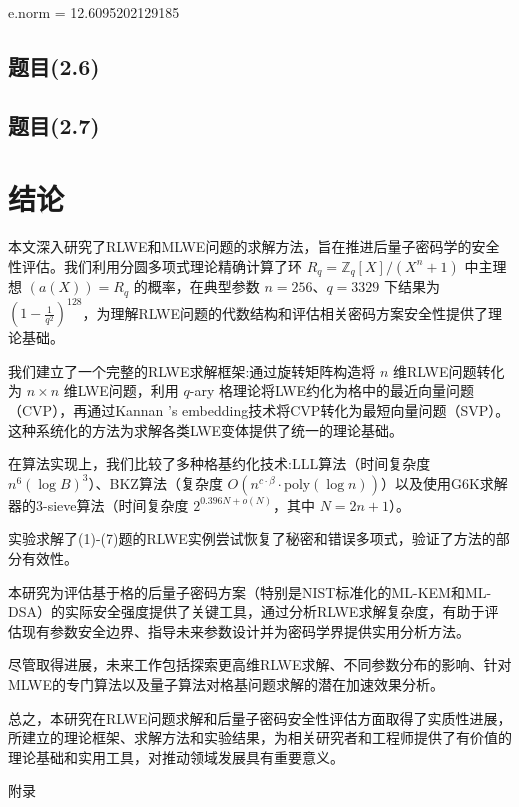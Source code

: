 \documentclass[12pt,a4paper]{article}
\numberwithin{equation}{section}
\begin{document}
e.norm = 12.6095202129185

\subsection{题目(2.6)}

\subsection{题目(2.7)}

\section{结论}

本文深入研究了RLWE和MLWE问题的求解方法，旨在推进后量子密码学的安全性评估。我们利用分圆多项式理论精确计算了环 $R_q = \mathbb{Z}_q[X]/(X^n + 1)$ 中主理想 $(a(X)) = R_q$ 的概率，在典型参数 $n = 256$、$q = 3329$ 下结果为 $(1-\frac{1}{q^2})^{128}$，为理解RLWE问题的代数结构和评估相关密码方案安全性提供了理论基础。

我们建立了一个完整的RLWE求解框架:通过旋转矩阵构造将 $n$ 维RLWE问题转化为 $n \times n$ 维LWE问题，利用 $q$-ary 格理论将LWE约化为格中的最近向量问题（CVP），再通过Kannan 's embedding技术将CVP转化为最短向量问题（SVP）。这种系统化的方法为求解各类LWE变体提供了统一的理论基础。

在算法实现上，我们比较了多种格基约化技术:LLL算法（时间复杂度 $n^6 (\log B)^3$）、BKZ算法（复杂度 $O(n^{c \cdot \beta} \cdot \text{poly}(\log n))$）以及使用G6K求解器的3-sieve算法（时间复杂度 $2^{0.396N+o(N)}$，其中 $N=2n+1$）。

实验求解了(1)-(7)题的RLWE实例尝试恢复了秘密和错误多项式，验证了方法的部分有效性。

本研究为评估基于格的后量子密码方案（特别是NIST标准化的ML-KEM和ML-DSA）的实际安全强度提供了关键工具，通过分析RLWE求解复杂度，有助于评估现有参数安全边界、指导未来参数设计并为密码学界提供实用分析方法。

尽管取得进展，未来工作包括探索更高维RLWE求解、不同参数分布的影响、针对MLWE的专门算法以及量子算法对格基问题求解的潜在加速效果分析。

总之，本研究在RLWE问题求解和后量子密码安全性评估方面取得了实质性进展，所建立的理论框架、求解方法和实验结果，为相关研究者和工程师提供了有价值的理论基础和实用工具，对推动领域发展具有重要意义。

\hspace*{\fill}

{\centering\heiti\fontsize{14pt}{21pt}\selectfont 附录\par}
\vspace{1em}
\end{document}
